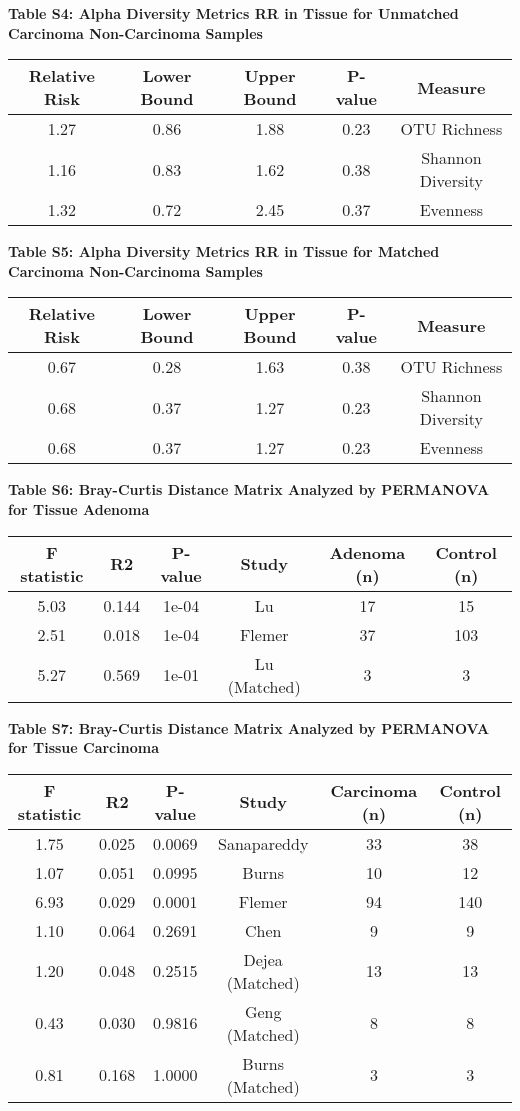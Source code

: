 \documentclass[12pt,]{article}
\begin{document}
\newpage

\textbf{Table S4: Alpha Diversity Metrics RR in Tissue for Unmatched
Carcinoma Non-Carcinoma Samples}

\begin{longtable}[]{@{}ccccc@{}}
\toprule
Relative Risk & Lower Bound & Upper Bound & P-value &
Measure\tabularnewline
\midrule
\endhead
1.27 & 0.86 & 1.88 & 0.23 & OTU Richness\tabularnewline
1.16 & 0.83 & 1.62 & 0.38 & Shannon Diversity\tabularnewline
1.32 & 0.72 & 2.45 & 0.37 & Evenness\tabularnewline
\bottomrule
\end{longtable}

\newpage

\textbf{Table S5: Alpha Diversity Metrics RR in Tissue for Matched
Carcinoma Non-Carcinoma Samples}

\begin{longtable}[]{@{}ccccc@{}}
\toprule
Relative Risk & Lower Bound & Upper Bound & P-value &
Measure\tabularnewline
\midrule
\endhead
0.67 & 0.28 & 1.63 & 0.38 & OTU Richness\tabularnewline
0.68 & 0.37 & 1.27 & 0.23 & Shannon Diversity\tabularnewline
0.68 & 0.37 & 1.27 & 0.23 & Evenness\tabularnewline
\bottomrule
\end{longtable}

\newpage

\textbf{Table S6: Bray-Curtis Distance Matrix Analyzed by PERMANOVA for
Tissue Adenoma}

\begin{longtable}[]{@{}cccccc@{}}
\toprule
F statistic & R2 & P-value & Study & Adenoma (n) & Control
(n)\tabularnewline
\midrule
\endhead
5.03 & 0.144 & 1e-04 & Lu & 17 & 15\tabularnewline
2.51 & 0.018 & 1e-04 & Flemer & 37 & 103\tabularnewline
5.27 & 0.569 & 1e-01 & Lu (Matched) & 3 & 3\tabularnewline
\bottomrule
\end{longtable}

\newpage

\textbf{Table S7: Bray-Curtis Distance Matrix Analyzed by PERMANOVA for
Tissue Carcinoma}

\begin{longtable}[]{@{}cccccc@{}}
\toprule
F statistic & R2 & P-value & Study & Carcinoma (n) & Control
(n)\tabularnewline
\midrule
\endhead
1.75 & 0.025 & 0.0069 & Sanapareddy & 33 & 38\tabularnewline
1.07 & 0.051 & 0.0995 & Burns & 10 & 12\tabularnewline
6.93 & 0.029 & 0.0001 & Flemer & 94 & 140\tabularnewline
1.10 & 0.064 & 0.2691 & Chen & 9 & 9\tabularnewline
1.20 & 0.048 & 0.2515 & Dejea (Matched) & 13 & 13\tabularnewline
0.43 & 0.030 & 0.9816 & Geng (Matched) & 8 & 8\tabularnewline
0.81 & 0.168 & 1.0000 & Burns (Matched) & 3 & 3\tabularnewline
\bottomrule
\end{longtable}
\end{document}
